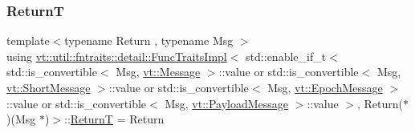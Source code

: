 \subsubsection{\texorpdfstring{ReturnT}{ReturnT}}
{\footnotesize\ttfamily template$<$typename Return , typename Msg $>$ \\
using \hyperlink{structvt_1_1util_1_1fntraits_1_1detail_1_1_func_traits_impl}{vt\+::util\+::fntraits\+::detail\+::\+Func\+Traits\+Impl}$<$ std\+::enable\+\_\+if\+\_\+t$<$ std\+::is\+\_\+convertible$<$ Msg, \hyperlink{namespacevt_a3a3ddfef40b4c90915fa43cdd5f129ea}{vt\+::\+Message} $>$\+::value or std\+::is\+\_\+convertible$<$ Msg, \hyperlink{namespacevt_a1125ac1da6c0bbf141e0ea0739d7602d}{vt\+::\+Short\+Message} $>$\+::value or std\+::is\+\_\+convertible$<$ Msg, \hyperlink{namespacevt_ad67368ffae52d7325002586b41bb150e}{vt\+::\+Epoch\+Message} $>$\+::value or std\+::is\+\_\+convertible$<$ Msg, \hyperlink{namespacevt_a89a92229c5622b855c02c549f83a1a68}{vt\+::\+Payload\+Message} $>$\+::value $>$, Return($\ast$)(Msg $\ast$)$>$\+::\hyperlink{structvt_1_1util_1_1fntraits_1_1detail_1_1_func_traits_impl_3_01std_1_1enable__if__t_3_01std_1_1b349e1ada243fe46f9d4e2c71aace5b1_a83a401d485de319f8eef7da787dbf55f}{ReturnT} =  Return}



